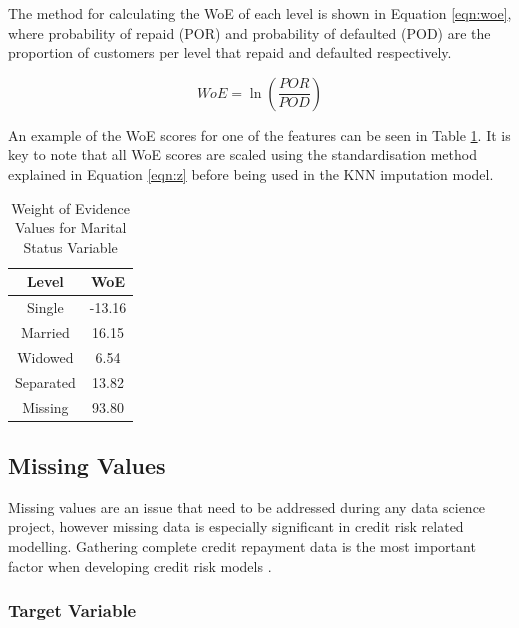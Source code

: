 The method for calculating the WoE of each level is shown in Equation \ref{eqn:woe}, where probability of repaid (POR) and probability of defaulted (POD) are the proportion of customers per level that repaid and defaulted respectively. 

\vspace{10pt}

\begin{equation}\label{eqn:woe}
    WoE = \ln{(\dfrac{POR}{POD})}
\end{equation}

\vspace{10pt}

An example of the WoE scores for one of the features can be seen in Table \ref{table:woe}. It is key to note that all WoE scores are scaled using the standardisation method explained in Equation \ref{eqn:z} before being used in the KNN imputation model.  

\vspace{10pt}

\begin{table}[H]
\begin{center}
\begin{tabular}{|c|c|} 
\hline
\multicolumn{1}{|c}{Level} &\multicolumn{1}{|c|}{WoE}\\
\hline
Single & -13.16  \\
\hline
Married & 16.15  \\
\hline
Widowed & 6.54  \\
\hline
Separated & 13.82\\
\hline
Missing & 93.80\\
\hline
\end{tabular}
\end{center}
\caption{Weight of Evidence Values for Marital Status Variable}
\label{table:woe}
\end{table}

\subsection{Missing Values}

Missing values are an issue that need to be addressed during any data science project, however missing data is especially significant in credit risk related modelling. Gathering complete credit repayment data is the most important factor when developing credit risk models \parencite{MissingValuesBos}.

\subsubsection{Target Variable}

